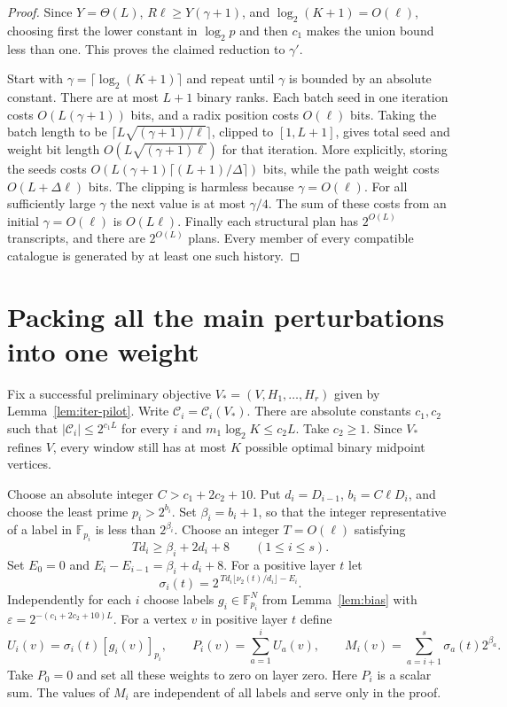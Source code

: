 \documentclass[11pt]{article}
\newcommand{\calC}{\mathcal C}
\begin{document}
\begin{proof}
Since $Y=\Theta(L)$, $R\ell\ge Y(\gamma+1)$, and
$\log_2(K+1)=O(\ell)$, choosing first the lower constant in
$\log_2 p$ and then $c_1$ makes the union bound less than one.
This proves the claimed reduction to $\gamma'$.

Start with $\gamma=\lceil\log_2(K+1)\rceil$ and repeat until $\gamma$
is bounded by an absolute constant. There are at most $L+1$ binary ranks.
Each batch seed in one iteration costs $O(L(\gamma+1))$ bits, and a radix
position costs $O(\ell)$ bits. Taking the batch length to be
$\lceil L\sqrt{(\gamma+1)/\ell}\rceil$, clipped to $[1,L+1]$, gives
total seed and weight bit length $O(L\sqrt{(\gamma+1)\ell})$ for that
iteration. More explicitly, storing the seeds costs
$O(L(\gamma+1)\lceil(L+1)/\Delta\rceil)$ bits, while the path weight
costs $O(L+\Delta\ell)$ bits. The clipping is harmless because
$\gamma=O(\ell)$. For all sufficiently large $\gamma$ the next value is
at most $\gamma/4$. The sum of these costs from an initial $\gamma=O(\ell)$
is $O(L\ell)$. Finally each structural plan has $2^{O(L)}$ transcripts,
and there are $2^{O(L)}$ plans. Every member of every compatible catalogue
is generated by at least one such history.
\end{proof}
\section{Packing all the main perturbations into one weight}

Fix a successful preliminary objective $V_*=(V,H_1,\ldots,H_r)$ given
by Lemma~\ref{lem:iter-pilot}. Write $\calC_i=\calC_i(V_*)$.
There are absolute constants $c_1,c_2$ such that
$|\calC_i|\le2^{c_1L}$ for every $i$ and $m_1\log_2 K\le c_2L$.
Take $c_2\ge1$. Since $V_*$ refines $V$, every window still has at
most $K$ possible optimal binary midpoint vertices.

Choose an absolute integer $C>c_1+2c_2+10$. Put
$d_i=D_{i-1}$, $b_i=C\ell D_i$, and choose the least prime $p_i>2^{b_i}$.
Set $\beta_i=b_i+1$, so that the integer representative of a label
in $\mathbb F_{p_i}$ is less than $2^{\beta_i}$. Choose an integer
$T=O(\ell)$ satisfying
\[
                     T d_i\ge\beta_i+2d_i+8\qquad(1\le i\le s).
\]
Set $E_0=0$ and $E_i-E_{i-1}=\beta_i+d_i+8$.
For a positive layer $t$ let
\[
    \sigma_i(t)=2^{\,T d_i\lfloor\nu_2(t)/d_i\rfloor-E_i}.
\]
Independently for each $i$ choose labels $g_i\in\mathbb F_{p_i}^N$
from Lemma~\ref{lem:bias} with
$\varepsilon=2^{-(c_1+2c_2+10)L}$.
For a vertex $v$ in positive layer $t$ define
\[
 U_i(v)=\sigma_i(t)[g_i(v)]_{p_i},\qquad
 P_i(v)=\sum_{a=1}^{i} U_a(v),\qquad
 M_i(v)=\sum_{a=i+1}^{s}\sigma_a(t)2^{\beta_a}.
\]
Take $P_0=0$ and set all these weights to zero on layer zero.
Here $P_i$ is a scalar sum. The values of $M_i$ are independent of all
labels and serve only in the proof.
\end{document}
